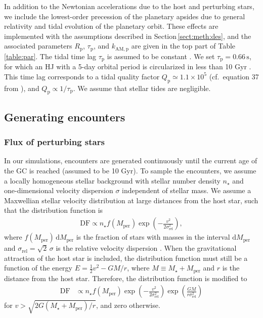 \documentclass[iop,usenatbib]{emulateapj}
\renewcommand{\S}{Section}
\newcommand{\mper}{M_\mathrm{per}}
\newcommand{\srel}{\sigma_\mathrm{rel}}
\begin{document}
In addition to the Newtonian accelerations due to the host and perturbing stars, we include the lowest-order precession of the planetary apsides due to general relativity and tidal evolution of the planetary orbit. These effects are implemented with the assumptions described in \S\,\ref{sect:meth:des}, and the associated parameters $R_\mathrm{p}$, $\tau_\mathrm{p}$, and $k_\mathrm{AM,p}$ are given in the top part of Table \ref{table:par}. The tidal time lag $\tau_\mathrm{p}$ is assumed to be constant \citep{2012arXiv1209.5723S}. We set $\tau_\mathrm{p} = 0.66 \, \mathrm{s}$, for which an HJ with a 5-day orbital period is circularized in less than 10 Gyr \citep{2012arXiv1209.5724S}. This time lag corresponds to a tidal quality factor $Q_\mathrm{p}\simeq 1.1\times 10^5$ (cf.\ equation 37 from \citealt{2012arXiv1209.5724S}), and $Q_\mathrm{p} \propto 1/\tau_\mathrm{p}$. We assume that stellar tides are negligible. 


\subsection{Generating encounters}
\label{sect:pop_syn:enc_gen}
\subsubsection{Flux of perturbing stars}
\label{sect:pop_syn:enc_gen:flux}

In our simulations, encounters are generated continuously until the current age of the GC is reached (assumed to be 10 Gyr). To sample the encounters, we assume a locally homogeneous stellar background with stellar number density $n_\star$ and one-dimensional velocity dispersion $\sigma$ independent of stellar mass. We assume a Maxwellian stellar velocity distribution at large distances from the host star, such that the distribution function is
\begin{align}
\label{eq:DF1}
\mathrm{DF} \propto n_\star f(\mper) \exp \left ( -\frac{v^2}{2\srel^2} \right ),
\end{align}
where $f(\mper)\,\mathrm{d}\mper$ is the fraction of stars with masses in the interval $\mathrm{d} \mper$ and $\srel= \sqrt{2} \, \sigma$ is the relative velocity dispersion \citep{2008gady.book.....B}.  When the gravitational attraction of the host star is included, the distribution function must still be a function of the energy $E = \frac{1}{2} v^2 - G M /r$, where $M\equiv M_\star + \mper$ and $r$ is the distance from the host star. Therefore, the distribution function is modified to
\begin{align}
\label{eq:DF2}
\mathrm{DF} &\propto n_\star f(\mper) \exp \left ( -\frac{v^2}{2\srel^2} \right ) \exp \left ( \frac{ GM}{r \srel^2} \right )
\end{align}
for $v > \sqrt{2G(M_\star+\mper)/r}$, and zero otherwise. 
\end{document}
